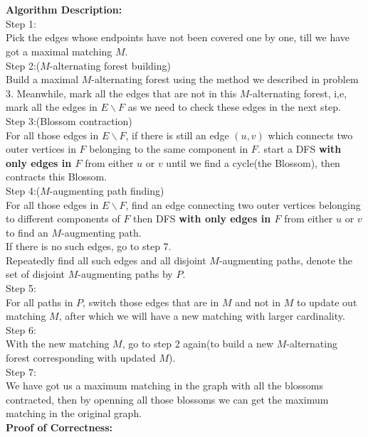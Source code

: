 \documentclass[12pt,letterpaper]{article}
\begin{document}
\section{}
\textbf{Algorithm Description:}\\
Step 1:\\
Pick the edges whose endpoints have not been covered one by one,
till we have got a maximal matching $M$.\\
Step 2:($M$-alternating forest building)\\
Build a maximal $M$-alternating forest using the method we described in problem 3.
Meanwhile, mark all the edges that are not in this $M$-alternating forest,
i,e, mark all the edges in $E\backslash F$
as we need to check these edges in the next step.\\
Step 3:(Blossom contraction)\\
For all those edges in $E\backslash F$,
if there is still an edge $(u,v)$ which connects two outer vertices in $F$
belonging to the same component in $F$.
start a DFS \textbf{with only edges in $F$} from either $u$ or $v$
until we find a cycle(the Blossom),
then contracts this Blossom.\\
Step 4:($M$-augmenting path finding)\\
For all those edges in $E\backslash F$,
find an edge connecting two outer vertices belonging to different components of $F$
then DFS \textbf{with only edges in $F$} from either $u$ or $v$
to find an $M$-augmenting path.\\
If there is no such edges, go to step 7.\\
Repeatedly find all such edges and all disjoint $M$-augmenting paths,
denote the set of disjoint $M$-augmenting paths by $P$.\\
Step 5:\\
For all paths in $P$, 
switch those edges that are in $M$ and not in $M$ to update out matching $M$,
after which we will have a new matching with larger cardinality.\\
Step 6:\\
With the new matching $M$,
go to step 2 again(to build a new $M$-alternating forest corresponding with updated $M$).\\
Step 7:\\
We have got us a maximum matching in the graph with all the blossoms contracted,
then by openning all those blossoms we can get the maximum matching in the original graph.\\
\newline
\textbf{Proof of Correctness:}\\
\end{document}
